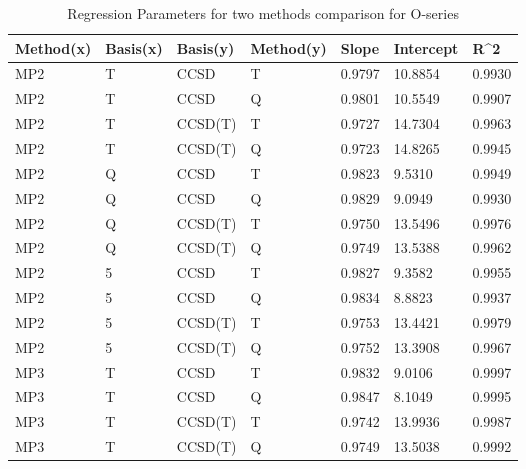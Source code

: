 \begin{table}
  \caption{Regression Parameters for two methods comparison for O-series}
  \label{tbl:regression-two-o}
  \begin{tabular}{l l l l l l l }
    \hline
    Method(x) & Basis(x) & Basis(y) & Method(y) & Slope & Intercept & R^2 \\ 
    \hline
    MP2 & T & CCSD & T & 0.9797 & 10.8854 & 0.9930 \\ 
    MP2 & T & CCSD & Q & 0.9801 & 10.5549 & 0.9907 \\ 
    MP2 & T & CCSD(T) & T & 0.9727 & 14.7304 & 0.9963 \\ 
    MP2 & T & CCSD(T) & Q & 0.9723 & 14.8265 & 0.9945 \\ 
    MP2 & Q & CCSD & T & 0.9823 & 9.5310 & 0.9949 \\ 
    MP2 & Q & CCSD & Q & 0.9829 & 9.0949 & 0.9930 \\ 
    MP2 & Q & CCSD(T) & T & 0.9750 & 13.5496 & 0.9976 \\ 
    MP2 & Q & CCSD(T) & Q & 0.9749 & 13.5388 & 0.9962 \\ 
    MP2 & 5 & CCSD & T & 0.9827 & 9.3582 & 0.9955 \\ 
    MP2 & 5 & CCSD & Q & 0.9834 & 8.8823 & 0.9937 \\ 
    MP2 & 5 & CCSD(T) & T & 0.9753 & 13.4421 & 0.9979 \\ 
    MP2 & 5 & CCSD(T) & Q & 0.9752 & 13.3908 & 0.9967 \\ 
    MP3 & T & CCSD & T & 0.9832 & 9.0106 & 0.9997 \\ 
    MP3 & T & CCSD & Q & 0.9847 & 8.1049 & 0.9995 \\ 
    MP3 & T & CCSD(T) & T & 0.9742 & 13.9936 & 0.9987 \\ 
    MP3 & T & CCSD(T) & Q & 0.9749 & 13.5038 & 0.9992 \\ 
    \hline
  \end{tabular}
\end{table}
